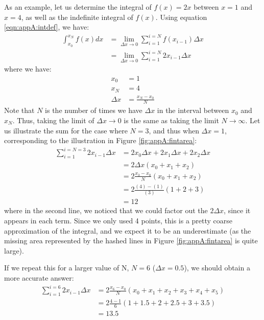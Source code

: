 As an example, let us determine the integral of $f(x)=2x$ between $x=1$ and $x=4$, as well as the indefinite integral of $f(x)$. Using equation \ref{eqn:appA:intdef}, we have:
\begin{align*}
\int_{x_0}^{x_N}f(x) dx&=\lim_{\Delta x\to 0}\sum_{i=1}^{i=N} f(x_{i-1}) \Delta x \\
&=\lim_{\Delta x\to 0}\sum_{i=1}^{i=N} 2x_{i-1} \Delta x 
\end{align*}
where we have:
\begin{align*}
x_0 &=1 \\
x_N &=4 \\
\Delta x &= \frac{x_N-x_0}{N}
\end{align*}
Note that $N$ is the number of times we have $\Delta x$ in the interval between $x_0$ and $x_N$. Thus, taking the limit of $\Delta x\to 0$ is the same as taking the limit $N\to\infty$. Let us illustrate the sum for the case where $N=3$, and thus when $\Delta x=1$, corresponding to the illustration in Figure \ref{fig:appA:fintarea}:
\begin{align*}
\sum_{i=1}^{i=N=3} 2x_{i-1} \Delta x &=2x_0\Delta x+2x_1\Delta x+2x_2\Delta x\\
&=2\Delta x (x_0+x_1+x_2) \\
&=2 \frac{x_3-x_0}{N}(x_0+x_1+x_2) \\
&=2 \frac{(4)-(1)}{(3)}(1+2+3) \\
&=12
\end{align*}
where in the second line, we noticed that we could factor out the $2\Delta x$, since it appears in each term. Since we only used 4 points, this is a pretty coarse approximation of the integral, and we expect it to be an underestimate (as the missing area represented by the hashed lines in Figure \ref{fig:appA:fintarea} is quite large).

If we repeat this for a larger value of N, $N=6$ ($\Delta x = 0.5$), we should obtain a more accurate answer:
\begin{align*}
\sum_{i=1}^{i=6} 2x_{i-1} \Delta x &=2 \frac{x_6-x_0}{N}(x_0+x_1+x_2+x_3+x_4+x_5)\\
&=2\frac{4-1}{6} (1+1.5+2+2.5+3+3.5)\\
&=13.5
\end{align*}

